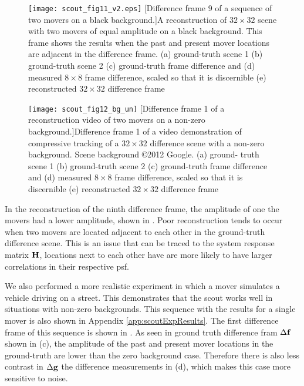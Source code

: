 \begin{figure}
	\centering
	\texttt{[image: scout\_fig11\_v2.eps]}
	[Difference frame 9 of a sequence of two movers on a black background.]{A reconstruction of $32 \times 32$ scene with two movers of equal amplitude on a black background. This frame shows the results when the past and present mover locations are adjacent in the difference frame. (a) ground-truth scene 1 (b) ground-truth scene 2 (c) ground-truth frame difference and (d) measured $8 \times 8$ frame difference, scaled so that it is discernible (e) reconstructed $32 \times 32$ difference frame}
	\label{fig:scout_fig11_un}
\end{figure}


\begin{figure}
	\centering
	\texttt{[image: scout\_fig12\_bg\_un]}
	[Difference frame 1 of a reconstruction video of two movers on a non-zero background.]{Difference frame 1 of a video demonstration of compressive tracking of a  $32 \times 32$ difference scene with a non-zero background. Scene background ©2012 Google. (a) ground- truth scene 1 (b) ground-truth scene 2 (c) ground-truth frame difference and (d) measured $8 \times 8$ frame difference, scaled so that it is discernible (e) reconstructed $32 \times 32$ difference frame}
	\label{fig:scout_fig12_bg_un}
\end{figure}


In the reconstruction of the ninth difference frame, the amplitude of one the movers had a lower amplitude, shown in . Poor reconstruction tends to occur when two movers are located adjacent to each other in the ground-truth difference scene. This is an issue that can be traced to the system response matrix $\mathbf{H}$, locations next to each other have are more likely to have larger correlations in their respective \gls{psf}.


We also performed a more realistic experiment in which a mover simulates a vehicle driving on a street. This demonstrates that the \gls{scout} works well in situations with non-zero backgrounds. This sequence with the results for a single mover is also shown in Appendix \ref{app:scoutExpResults}. The first difference frame of this sequence is shown in . As seen in ground truth difference fram $\Delta \mathbf{f}$ shown in (c), the amplitude of the past and present mover locations in the ground-truth are lower than the zero background case. Therefore there is also less contrast in $\Delta \mathbf{g}$ the difference measurements in (d), which makes this case more sensitive to noise. 

